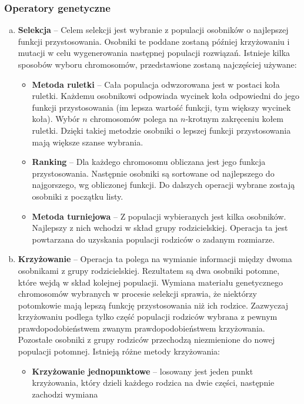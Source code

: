 \subsubsection*{Operatory genetyczne}
\begin{enumerate}[a)]
    \item \textbf{Selekcja} -- Celem selekcji jest wybranie z populacji osobników o najlepszej funkcji przystosowania. Osobniki te poddane zostaną 
	później krzyżowaniu i mutacji w celu wygenerowania następnej populacji rozwiązań. Istnieje kilka sposobów wyboru chromosomów, przedstawione zostaną 
	najczęściej używane:
		\begin{itemize}
			\item \textbf{Metoda ruletki} -- Cała populacja odwzorowana jest w postaci koła ruletki. Każdemu osobnikowi odpowiada wycinek koła odpowiedni do jego 
			funkcji przystosowania (im lepsza wartość funkcji, tym większy wycinek koła). Wybór $n$ chromosomów polega na $n$-krotnym zakręceniu kołem ruletki. 
			Dzięki takiej metodzie osobniki o lepszej funkcji przystosowania mają większe szanse wybrania.
			\item \textbf{Ranking} -- Dla każdego chromosomu obliczana jest jego funkcja przystosowania. Następnie osobniki są sortowane od najlepszego 
			do najgorszego, wg obliczonej funkcji. Do dalszych operacji wybrane zostają osobniki z początku listy.
			\item \textbf{Metoda turniejowa} -- Z populacji wybieranych jest kilka osobników. Najlepszy z nich wchodzi w skład grupy rodzicielskiej. Operacja 
			ta jest powtarzana do uzyskania populacji rodziców o zadanym rozmiarze.
		\end{itemize}
    \item \textbf{Krzyżowanie} -- Operacja ta polega na wymianie informacji między dwoma osobnikami z grupy rodzicielskiej. 
	Rezultatem są dwa osobniki potomne, które wejdą w skład kolejnej populacji. Wymiana materiału genetycznego chromosomów wybranych w procesie selekcji 
	sprawia, że niektórzy potomkowie mają lepszą funkcję przystosowania niż ich rodzice. Zazwyczaj krzyżowaniu podlega tylko część populacji 
	rodziców wybrana z pewnym prawdopodobieństwem zwanym prawdopodobieństwem krzyżowania. Pozostałe osobniki z grupy rodziców przechodzą niezmienione 
	do nowej populacji potomnej. Istnieją różne metody krzyżowania:
		\begin{itemize}
			\item \textbf{Krzyżowanie jednopunktowe} -- losowany jest jeden punkt krzyżowania, który dzieli każdego rodzica na dwie części, następnie zachodzi wymiana 

\end{itemize}
\end{enumerate}
